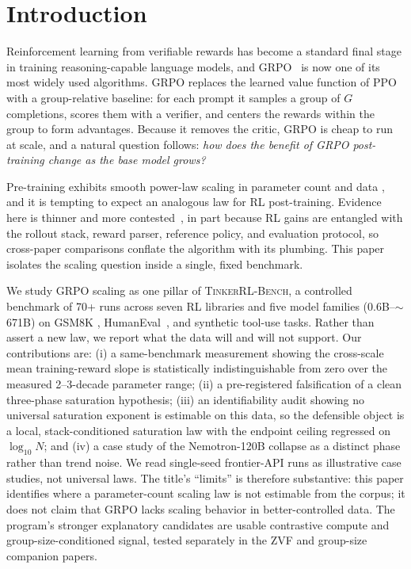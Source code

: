 \documentclass{article}
\newcommand{\ours}{\textsc{TinkerRL-Bench}}
\begin{document}
 \section{Introduction}
\label{sec:p1-intro}
Reinforcement learning from verifiable rewards has become a standard final stage
in training reasoning-capable language models, and GRPO~\citep{shao2024deepseekmath, guo2025deepseekr1} is now one of its most widely used algorithms. GRPO replaces
the learned value function of PPO~\citep{schulman2017proximal} with a
group-relative baseline: for each prompt it samples a group of $G$ completions,
scores them with a verifier, and centers the rewards within the group to form
advantages. Because it removes the critic, GRPO is cheap to run at scale, and a
natural question follows: \emph{how does the benefit of GRPO post-training change
as the base model grows?}

Pre-training exhibits smooth power-law scaling in parameter count and data
\citep{kaplan2020scalinglaws, hoffmann2022chinchilla}, and it is tempting to expect
an analogous law for RL post-training. Evidence here is thinner and more
contested~\citep{hilton2023rlscaling, rafailov2024rlhfscaling, nimmaturi2025predictive},
in part because RL gains are entangled with the rollout stack, reward parser,
reference policy, and evaluation protocol, so cross-paper comparisons conflate the
algorithm with its plumbing. This paper isolates the scaling question inside a
single, fixed benchmark.

We study GRPO scaling as one pillar of \ours{}, a controlled benchmark of 70+ runs
across seven RL libraries and five model families ($0.6$B--$\sim$671B) on GSM8K
\citep{cobbe2021training}, HumanEval~\citep{chen2021codex}, and synthetic tool-use
tasks. Rather than assert a new law, we report what the data will and will not
support. Our contributions are: (i) a same-benchmark measurement showing the
cross-scale mean training-reward slope is statistically indistinguishable from zero
over the measured 2--3-decade parameter range; (ii) a pre-registered falsification of a clean
three-phase saturation hypothesis; (iii) an identifiability audit showing no
universal saturation exponent is estimable on this data, so the defensible object
is a local, stack-conditioned saturation law with the endpoint ceiling regressed
on $\log_{10} N$; and (iv) a case study of the Nemotron-120B collapse as a
distinct phase rather than trend noise. We read single-seed frontier-API runs as
illustrative case studies, not universal laws. The title's ``limits'' is therefore
substantive: this paper identifies where a parameter-count scaling law is not
estimable from the corpus; it does not claim that GRPO lacks scaling behavior in
better-controlled data. The program's stronger explanatory candidates are usable
contrastive compute and group-size-conditioned signal, tested separately in the
ZVF and group-size companion papers.
\end{document}

